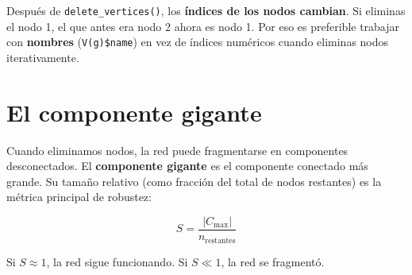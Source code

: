 \documentclass[
  letterpaper,
  DIV=11,
  numbers=noendperiod]{scrreprt}
\newenvironment{Shaded}{\begin{snugshade}}{\end{snugshade}}
\newcommand{\CommentTok}[1]{\textcolor[rgb]{0.37,0.37,0.37}{#1}}
\newcommand{\ControlFlowTok}[1]{\textcolor[rgb]{0.00,0.23,0.31}{\textbf{#1}}}
\newcommand{\FunctionTok}[1]{\textcolor[rgb]{0.28,0.35,0.67}{#1}}
\newcommand{\NormalTok}[1]{\textcolor[rgb]{0.00,0.23,0.31}{#1}}
\newcommand{\OtherTok}[1]{\textcolor[rgb]{0.00,0.23,0.31}{#1}}
\newcommand{\SpecialCharTok}[1]{\textcolor[rgb]{0.37,0.37,0.37}{#1}}
\newcommand{\StringTok}[1]{\textcolor[rgb]{0.13,0.47,0.30}{#1}}
\begin{document}
\begin{tcolorbox}[enhanced jigsaw, toprule=.15mm, colframe=quarto-callout-warning-color-frame, coltitle=black, titlerule=0mm, colback=white, breakable, leftrule=.75mm, arc=.35mm, bottomtitle=1mm, toptitle=1mm, rightrule=.15mm, bottomrule=.15mm, left=2mm, title=\textcolor{quarto-callout-warning-color}{\faExclamationTriangle}\hspace{0.5em}{⚠️ Error frecuente}, colbacktitle=quarto-callout-warning-color!10!white, opacityback=0, opacitybacktitle=0.6]

Después de \texttt{delete\_vertices()}, los \textbf{índices de los nodos
cambian}. Si eliminas el nodo 1, el que antes era nodo 2 ahora es nodo
1. Por eso es preferible trabajar con \textbf{nombres}
(\texttt{V(g)\$name}) en vez de índices numéricos cuando eliminas nodos
iterativamente.

\end{tcolorbox}

\section{El componente gigante}\label{el-componente-gigante}

Cuando eliminamos nodos, la red puede fragmentarse en componentes
desconectados. El \textbf{componente gigante} es el componente conectado
más grande. Su tamaño relativo (como fracción del total de nodos
restantes) es la métrica principal de robustez:

\[
S = \frac{|C_{\max}|}{n_{\text{restantes}}}
\]

Si \(S \approx 1\), la red sigue funcionando. Si \(S \ll 1\), la red se
fragmentó.

\begin{Shaded}
\end{Shaded}
\end{document}
